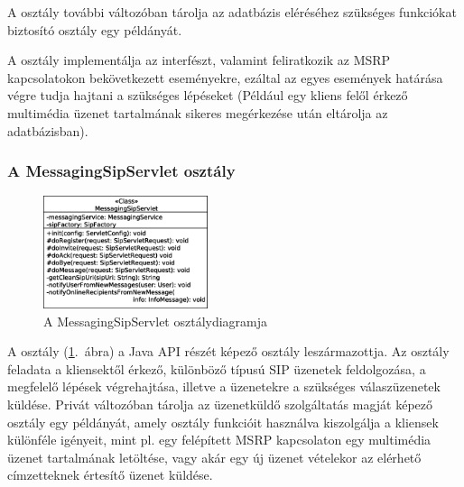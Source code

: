 A  osztály további változóban tárolja az adatbázis eléréséhez szükséges funkciókat biztosító  osztály egy példányát. 

A  osztály implementálja az  interfészt, valamint feliratkozik az MSRP kapcsolatokon bekövetkezett eseményekre, ezáltal az egyes események határása végre tudja hajtani a szükséges lépéseket (Például egy kliens felől érkező multimédia üzenet tartalmának sikeres megérkezése után eltárolja az adatbázisban).

\subsubsection*{A MessagingSipServlet osztály}
\label{sec:server_messagingsipservlet}

\begin{figure}
  \vspace{-15pt}
  \begin{center}
    \includegraphics[width=0.43\textwidth]{img/class_diagrams/server/eps/MessagingSipServlet.eps}
  \end{center}
  \vspace{-15pt}
  \captionsetup{font=scriptsize}
  \caption{A MessagingSipServlet osztálydiagramja}
   \label{fig:class_server_messagingsipservlet}
  \vspace{-10pt}
\end{figure}

A  osztály (\ref{fig:class_server_messagingsipservlet}.~ábra) a Java API részét képező  osztály leszármazottja. Az osztály feladata a kliensektől érkező, különböző típusú SIP üzenetek feldolgozása, a megfelelő lépések végrehajtása, illetve a üzenetekre a szükséges válaszüzenetek küldése. Privát változóban tárolja az üzenetküldő szolgáltatás magját képező  osztály egy példányát, amely osztály funkcióit használva kiszolgálja a kliensek különféle igényeit, mint pl. egy felépített MSRP kapcsolaton egy multimédia üzenet tartalmának letöltése, vagy akár egy új üzenet vételekor az elérhető címzetteknek értesítő üzenet küldése.

